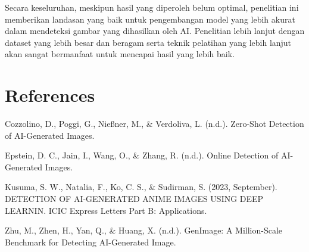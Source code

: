 \documentclass[12pt,a4paper]{article}
\begin{document}
Secara keseluruhan, meskipun hasil yang diperoleh belum optimal, penelitian ini memberikan landasan yang baik untuk pengembangan model yang lebih akurat dalam mendeteksi gambar yang dihasilkan oleh AI. Penelitian lebih lanjut dengan dataset yang lebih besar dan beragam serta teknik pelatihan yang lebih lanjut akan sangat bermanfaat untuk mencapai hasil yang lebih baik.

\newpage
\section*{References}

Cozzolino, D., Poggi, G., Nießner, M., & Verdoliva, L. (n.d.). Zero-Shot Detection of AI-Generated Images.

Epstein, D. C., Jain, I., Wang, O., & Zhang, R. (n.d.). Online Detection of AI-Generated Images.

Kusuma, S. W., Natalia, F., Ko, C. S., & Sudirman, S. (2023, September). DETECTION OF AI-GENERATED ANIME IMAGES USING DEEP LEARNIN. ICIC Express Letters Part B: Applications.

Zhu, M., Zhen, H., Yan, Q., & Huang, X. (n.d.). GenImage: A Million-Scale Benchmark for Detecting AI-Generated Image.
\end{document}
